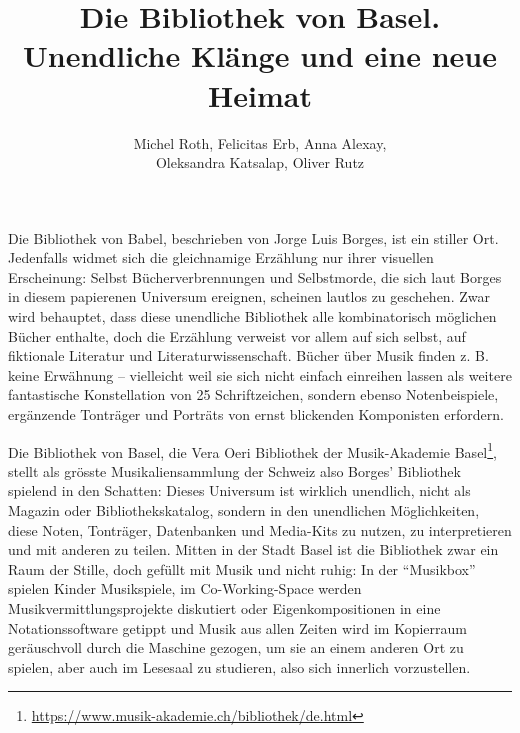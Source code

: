 \documentclass[a4paper,
fontsize=11pt,
oneside,
numbers=noperiodatend,
parskip=half-,
bibliography=totoc,
final
]{scrartcl}
\title{\LARGE{Die Bibliothek von Basel. Unendliche Klänge und eine neue Heimat}}%
\author{Michel Roth, Felicitas Erb, Anna Alexay, \\ Oleksandra Katsalap, Oliver Rutz} %
\date{}
\begin{document}
\maketitle
\thispagestyle{fancyplain} 


Die Bibliothek von Babel, beschrieben von Jorge Luis Borges, ist ein
stiller Ort. Jedenfalls widmet sich die gleichnamige Erzählung nur ihrer
visuellen Erscheinung: Selbst Bücherverbrennungen und
Selbstmorde, die sich laut Borges in diesem papierenen Universum
ereignen, scheinen lautlos zu geschehen. Zwar wird behauptet, dass diese
unendliche Bibliothek alle kombinatorisch möglichen Bücher enthalte,
doch die Erzählung verweist vor allem auf sich selbst, auf fiktionale
Literatur und Literaturwissenschaft. Bücher über Musik finden z. B.
keine Erwähnung -- vielleicht weil sie sich nicht einfach einreihen
lassen als weitere fantastische Konstellation von 25 Schriftzeichen,
sondern ebenso Notenbeispiele, ergänzende Tonträger und Porträts von
ernst blickenden Komponisten erfordern.

Die Bibliothek von Basel, die Vera Oeri Bibliothek der Musik-Akademie
Basel\footnote{\url{https://www.musik-akademie.ch/bibliothek/de.html}},
stellt als grösste Musikaliensammlung der Schweiz also Borges'
Bibliothek spielend in den Schatten: Dieses Universum ist wirklich
unendlich, nicht als Magazin oder Bibliothekskatalog, sondern in den
unendlichen Möglichkeiten, diese Noten, Tonträger, Datenbanken und
Media-Kits zu nutzen, zu interpretieren und mit anderen zu teilen.
Mitten in der Stadt Basel ist die Bibliothek zwar ein Raum der Stille,
doch gefüllt mit Musik und nicht ruhig: In der \enquote{Musikbox}
spielen Kinder Musikspiele, im Co-Working-Space werden
Musikvermittlungsprojekte diskutiert oder Eigenkompositionen in eine
Notationssoftware getippt und Musik aus allen Zeiten wird im Kopierraum
geräuschvoll durch die Maschine gezogen, um sie an einem anderen Ort zu
spielen, aber auch im Lesesaal zu studieren, also sich innerlich
vorzustellen.
\end{document}
